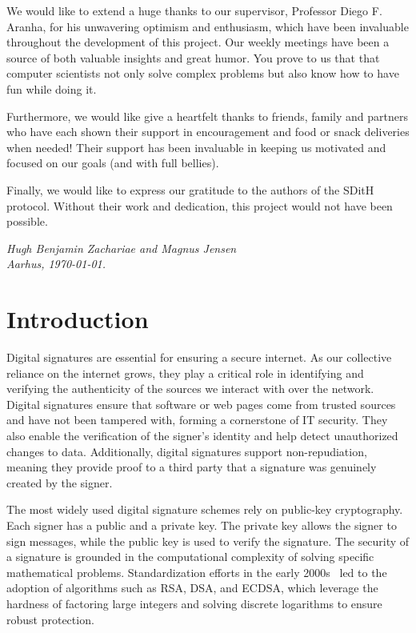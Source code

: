 \documentclass[11pt]{report}
\theoremstyle{definition}
\theoremstyle{plain}
\begin{document}
We would like to extend a huge thanks to our supervisor, Professor Diego F. Aranha, for his unwavering optimism and enthusiasm, which have been invaluable throughout the development of this project. Our weekly meetings have been a source of both valuable insights and great humor. You prove to us that that computer scientists not only solve complex problems but also know how to have fun while doing it.

Furthermore, we would like give a heartfelt thanks to friends, family and partners who have each shown their support in encouragement and food or snack deliveries when needed! Their support has been invaluable in keeping us motivated and focused on our goals (and with full bellies).

Finally, we would like to express our gratitude to the authors of the SDitH protocol. Without their work and dedication, this project would not have been possible.

\vspace{2ex}
\begin{flushright}
  \textit{Hugh Benjamin Zachariae and Magnus Jensen}\\
  \textit{Aarhus, \today.}
\end{flushright}

\tableofcontents
\cleardoublepage
{}
\setcounter{secnumdepth}{3}


\chapter{Introduction}\label{ch:intro}

Digital signatures are essential for ensuring a secure internet. As our collective reliance on the internet grows, they play a critical role in identifying and verifying the authenticity of the sources we interact with over the network. Digital signatures ensure that software or web pages come from trusted sources and have not been tampered with, forming a cornerstone of IT security. They also enable the verification of the signer's identity and help detect unauthorized changes to data. Additionally, digital signatures support non-repudiation, meaning they provide proof to a third party that a signature was genuinely created by the signer.

The most widely used digital signature schemes rely on public-key cryptography. Each signer has a public and a private key. The private key allows the signer to sign messages, while the public key is used to verify the signature. The security of a signature is grounded in the computational complexity of solving specific mathematical problems. Standardization efforts in the early 2000s~\cite{pub2000digital} led to the adoption of algorithms such as RSA, DSA, and ECDSA, which leverage the hardness of factoring large integers and solving discrete logarithms to ensure robust protection.
\end{document}
